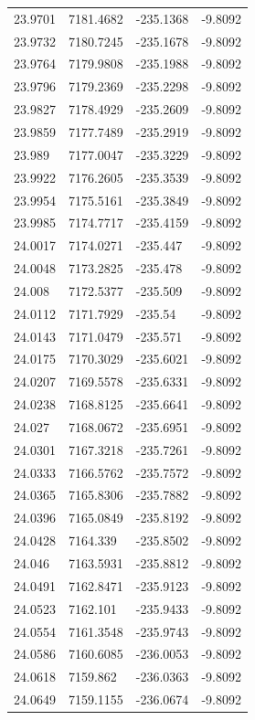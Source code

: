 \begin{table}[H]
\begin{tabular}{llll}
23.9701 & 7181.4682 & -235.1368 & -9.8092 \\
23.9732 & 7180.7245 & -235.1678 & -9.8092 \\
23.9764 & 7179.9808 & -235.1988 & -9.8092 \\
23.9796 & 7179.2369 & -235.2298 & -9.8092 \\
23.9827 & 7178.4929 & -235.2609 & -9.8092 \\
23.9859 & 7177.7489 & -235.2919 & -9.8092 \\
23.989 & 7177.0047 & -235.3229 & -9.8092 \\
23.9922 & 7176.2605 & -235.3539 & -9.8092 \\
23.9954 & 7175.5161 & -235.3849 & -9.8092 \\
23.9985 & 7174.7717 & -235.4159 & -9.8092 \\
24.0017 & 7174.0271 & -235.447 & -9.8092 \\
24.0048 & 7173.2825 & -235.478 & -9.8092 \\
24.008 & 7172.5377 & -235.509 & -9.8092 \\
24.0112 & 7171.7929 & -235.54 & -9.8092 \\
24.0143 & 7171.0479 & -235.571 & -9.8092 \\
24.0175 & 7170.3029 & -235.6021 & -9.8092 \\
24.0207 & 7169.5578 & -235.6331 & -9.8092 \\
24.0238 & 7168.8125 & -235.6641 & -9.8092 \\
24.027 & 7168.0672 & -235.6951 & -9.8092 \\
24.0301 & 7167.3218 & -235.7261 & -9.8092 \\
24.0333 & 7166.5762 & -235.7572 & -9.8092 \\
24.0365 & 7165.8306 & -235.7882 & -9.8092 \\
24.0396 & 7165.0849 & -235.8192 & -9.8092 \\
24.0428 & 7164.339 & -235.8502 & -9.8092 \\
24.046 & 7163.5931 & -235.8812 & -9.8092 \\
24.0491 & 7162.8471 & -235.9123 & -9.8092 \\
24.0523 & 7162.101 & -235.9433 & -9.8092 \\
24.0554 & 7161.3548 & -235.9743 & -9.8092 \\
24.0586 & 7160.6085 & -236.0053 & -9.8092 \\
24.0618 & 7159.862 & -236.0363 & -9.8092 \\
24.0649 & 7159.1155 & -236.0674 & -9.8092 \\

\end{tabular}
\end{table}

